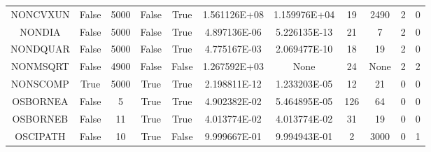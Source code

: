 \begin{longtable}{ccccccccccc}
	\cellcolor{default2} NONCVXUN& \cellcolor{default2} False& \cellcolor{default2} 5000& \cellcolor{default2} False& \cellcolor{default2} True& \cellcolor{poor} 1.561126E+08& \cellcolor{best} 1.159976E+04& \cellcolor{best} 19& \cellcolor{poor} 2490& \cellcolor{default2} 2& \cellcolor{default2} 0\\
	\cellcolor{default1} NONDIA& \cellcolor{default1} False& \cellcolor{default1} 5000& \cellcolor{default1} False& \cellcolor{default1} True& \cellcolor{ok} 4.897136E-06& \cellcolor{best} 5.226135E-13& \cellcolor{poor} 21& \cellcolor{best} 7& \cellcolor{default1} 2& \cellcolor{default1} 0\\
	\cellcolor{default2} NONDQUAR& \cellcolor{default2} False& \cellcolor{default2} 5000& \cellcolor{default2} False& \cellcolor{default2} True& \cellcolor{poor} 4.775167E-03& \cellcolor{best} 2.069477E-10& \cellcolor{best} 18& \cellcolor{ok} 19& \cellcolor{default2} 2& \cellcolor{default2} 0\\
	\cellcolor{default1} NONMSQRT& \cellcolor{default1} False& \cellcolor{default1} 4900& \cellcolor{default1} False& \cellcolor{default1} False& \cellcolor{best} 1.267592E+03& \cellcolor{err} None& \cellcolor{best} 24& \cellcolor{err} None& \cellcolor{default1} 2& \cellcolor{default1} 2\\
	\cellcolor{default2} NONSCOMP& \cellcolor{default2} True& \cellcolor{default2} 5000& \cellcolor{default2} True& \cellcolor{default2} True& \cellcolor{best} 2.198811E-12& \cellcolor{ok} 1.233203E-05& \cellcolor{best} 12& \cellcolor{ok} 21& \cellcolor{default2} 0& \cellcolor{default2} 0\\
	\cellcolor{default1} OSBORNEA& \cellcolor{default1} False& \cellcolor{default1} 5& \cellcolor{default1} True& \cellcolor{default1} True& \cellcolor{poor} 4.902382E-02& \cellcolor{best} 5.464895E-05& \cellcolor{ok} 126& \cellcolor{best} 64& \cellcolor{default1} 0& \cellcolor{default1} 0\\
	\cellcolor{default2} OSBORNEB& \cellcolor{default2} False& \cellcolor{default2} 11& \cellcolor{default2} True& \cellcolor{default2} True& \cellcolor{best} 4.013774E-02& \cellcolor{ok} 4.013774E-02& \cellcolor{ok} 31& \cellcolor{best} 19& \cellcolor{default2} 0& \cellcolor{default2} 0\\
	\cellcolor{default1} OSCIPATH& \cellcolor{default1} False& \cellcolor{default1} 10& \cellcolor{default1} True& \cellcolor{default1} False& \cellcolor{poor} 9.999667E-01& \cellcolor{best} 9.994943E-01& \cellcolor{best} 2& \cellcolor{poor} 3000& \cellcolor{default1} 0& \cellcolor{default1} 1\\

\end{longtable}
